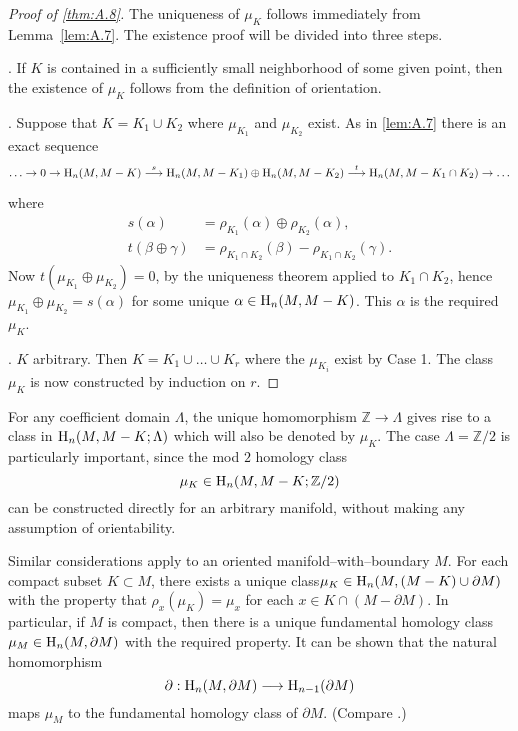 \documentclass[../main]{subfiles}
\begin{document}
\begin{proof}[Proof of \ref{thm:A.8}]
The uniqueness of $\mu_K$ follows immediately from Lemma~\ref{lem:A.7}. The existence proof will be divided into three steps.

. If $K$ is contained in a sufficiently small neighborhood of some given point, then the existence of $\mu_K$ follows from the definition of orientation. 

. Suppose that $K = K_1 \cup K_2$ where $\mu_{K_1}$ and $\mu_{K_2}$ exist. As in \ref{lem:A.7} there is an exact sequence \[\ldots \to 0 \to \homology_n(M, M - K) \varrightarrow{s} \homology_n(M, M - K_1) \oplus \homology_n(M, M - K_2) \varrightarrow{t} \homology_n(M, M - K_1 \cap K_2) \to \ldots\] where 
\begin{align*}
s(\alpha) & = \rho_{K_1}(\alpha) \oplus \rho_{K_2}(\alpha), \\ t(\beta \oplus \gamma) & = \rho_{K_1 \cap K_2}(\beta) - \rho_{K_1 \cap K_2}(\gamma). 
\end{align*}
Now $t(\mu_{K_1} \oplus \mu_{K_2}) = 0$, by the uniqueness theorem applied to $K_1 \cap K_2$, hence $\mu_{K_1} \oplus \mu_{K_2} = s(\alpha)$ for some unique $\alpha \in \operatorname{H}_n(M, M - K)$. This $\alpha$ is the required $\mu_K$. 

. $K$ arbitrary. Then $K = K_1 \cup \ldots \cup K_r$ where the $\mu_{K_i}$ exist by Case 1. The class $\mu_K$ is now constructed by induction on $r$. 
\end{proof}
\begin{remark}
For any coefficient domain $\Lambda$, the unique homomorphism $\mathbb Z \longrightarrow \Lambda$ gives rise to a class in $\operatorname{H}_n(M, M - K; \Lambda)$ which will also be denoted by $\mu_K$. The case $\Lambda = {\mathbb Z}/2$ is particularly important, since the mod $2$ homology class \[\mu_K \in \operatorname{H}_n(M, M - K; {\mathbb Z}/2)\] can be constructed directly for an arbitrary manifold, without making any assumption of orientability. 
\end{remark}

\begin{remark}
Similar considerations apply to an oriented manifold--with--boundary $M$. For each compact subset $K \subset M$, there exists a unique class\newline $\mu_K \in \operatorname{H}_n(M, (M - K) \cup \partial M)$ with the property that $\rho_x(\mu_K) = \mu_x$ for each $x \in K \cap (M - \partial M)$. In particular, if $M$ is compact, then there is a unique fundamental homology class $\mu_M \in \operatorname{H}_n(M, \partial M)$ with the required property. It can be shown that the natural homomorphism \[\partial : \operatorname{H}_n(M, \partial M) \longrightarrow \operatorname{H}_{n - 1}(\partial M)\] maps $\mu_M$ to the fundamental homology class of $\partial M$. (Compare \cite[p. 304]{spanier1981}.)
\end{remark}
\end{document}
